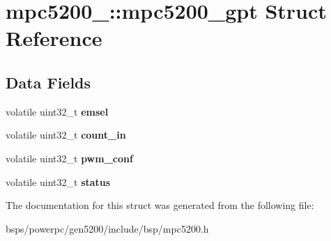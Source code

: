 \hypertarget{structmpc5200___1_1mpc5200__gpt}{}\section{mpc5200\+\_\+\+::mpc5200\+\_\+gpt Struct Reference}
\label{structmpc5200___1_1mpc5200__gpt}
\subsection*{Data Fields}
\begin{DoxyCompactItemize}
\item 
\mbox{\label{structmpc5200___1_1mpc5200__gpt_af2dcc80f8b7b9482f8e8c3abc9b8ef1d}} 
volatile uint32\+\_\+t {\bfseries emsel}
\item 
\mbox{\label{structmpc5200___1_1mpc5200__gpt_af91fda2ba4e7a648f9cbd05f5b684cd9}} 
volatile uint32\+\_\+t {\bfseries count\+\_\+in}
\item 
\mbox{\label{structmpc5200___1_1mpc5200__gpt_a589b948649341a004b4e3846bf33927f}} 
volatile uint32\+\_\+t {\bfseries pwm\+\_\+conf}
\item 
\mbox{\label{structmpc5200___1_1mpc5200__gpt_a46fe4b9b9a41a53d13799687a662ba39}} 
volatile uint32\+\_\+t {\bfseries status}
\end{DoxyCompactItemize}


The documentation for this struct was generated from the following file\+:\begin{DoxyCompactItemize}
\item 
bsps/powerpc/gen5200/include/bsp/mpc5200.\+h\end{DoxyCompactItemize}

